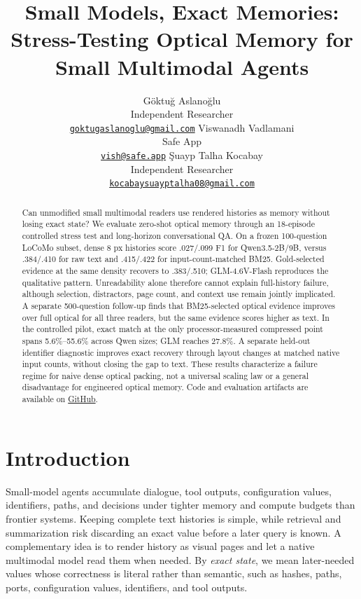 \documentclass{article}
\title{Small Models, Exact Memories: Stress-Testing Optical Memory for Small Multimodal Agents}
\author{G{\"o}ktu{\u{g}} Aslano{\u{g}}lu\\Independent Researcher\\
  {\small\href{mailto:goktugaslanoglu@gmail.com}{\texttt{goktugaslanoglu@gmail.com}}}
  \And Viswanadh Vadlamani\\Safe App\\
  {\small\href{mailto:vish@safe.app}{\texttt{vish@safe.app}}}
  \And \c{S}uayp Talha Kocabay\\Independent Researcher\\
  {\small\href{mailto:kocabaysuayptalha08@gmail.com}{\texttt{kocabaysuayptalha08@gmail.com}}}}
\begin{document}
\raggedbottom

\maketitle

\begin{abstract}
Can unmodified small multimodal readers use rendered histories as memory without losing exact state? We evaluate zero-shot optical memory through an 18-episode controlled stress test and long-horizon conversational QA. On a frozen 100-question LoCoMo subset, dense 8 px histories score .027/.099 F1 for Qwen3.5-2B/9B, versus .384/.410 for raw text and .415/.422 for input-count-matched BM25. Gold-selected evidence at the same density recovers to .383/.510; GLM-4.6V-Flash reproduces the qualitative pattern. Unreadability alone therefore cannot explain full-history failure, although selection, distractors, page count, and context use remain jointly implicated. A separate 500-question follow-up finds that BM25-selected optical evidence improves over full optical for all three readers, but the same evidence scores higher as text. In the controlled pilot, exact match at the only processor-measured compressed point spans 5.6\%--55.6\% across Qwen sizes; GLM reaches 27.8\%. A separate held-out identifier diagnostic improves exact recovery through layout changes at matched native input counts, without closing the gap to text. These results characterize a failure regime for naive dense optical packing, not a universal scaling law or a general disadvantage for engineered optical memory.
Code and evaluation artifacts are available on \href{https://github.com/GoktugAslanoglu/Small-Models-Exact-Memories}{GitHub}.
\end{abstract}

\section{Introduction}

Small-model agents accumulate dialogue, tool outputs, configuration values, identifiers, paths, and decisions under tighter memory and compute budgets than frontier systems. Keeping complete text histories is simple, while retrieval and summarization risk discarding an exact value before a later query is known. A complementary idea is to render history as visual pages and let a native multimodal model read them when needed. By \emph{exact state}, we mean later-needed values whose correctness is literal rather than semantic, such as hashes, paths, ports, configuration values, identifiers, and tool outputs.
\end{document}
